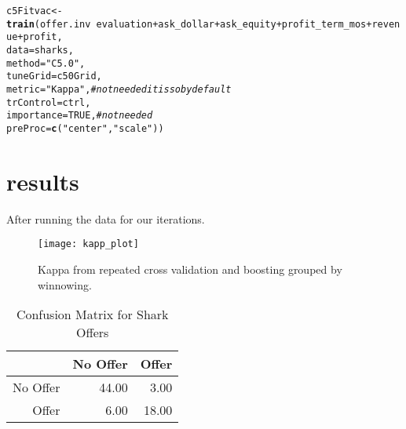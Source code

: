 \documentclass[11pt]{article}\usepackage[]{graphicx}\usepackage[]{color}
\makeatletter
\newcommand{\hlnum}[1]{\textcolor[rgb]{0.686,0.059,0.569}{#1}}%
\newcommand{\hlstr}[1]{\textcolor[rgb]{0.192,0.494,0.8}{#1}}%
\newcommand{\hlcom}[1]{\textcolor[rgb]{0.678,0.584,0.686}{\textit{#1}}}%
\newcommand{\hlopt}[1]{\textcolor[rgb]{0,0,0}{#1}}%
\newcommand{\hlstd}[1]{\textcolor[rgb]{0.345,0.345,0.345}{#1}}%
\newcommand{\hlkwb}[1]{\textcolor[rgb]{0.69,0.353,0.396}{#1}}%
\newcommand{\hlkwc}[1]{\textcolor[rgb]{0.333,0.667,0.333}{#1}}%
\newcommand{\hlkwd}[1]{\textcolor[rgb]{0.737,0.353,0.396}{\textbf{#1}}}%
\newenvironment{kframe}{%
 \def\at@end@of@kframe{}%
 \ifinner\ifhmode%
  \def\at@end@of@kframe{\end{minipage}}%
  \begin{minipage}{\columnwidth}%
 \fi\fi%
 \def\FrameCommand##1{\hskip\@totalleftmargin \hskip-\fboxsep
 \colorbox{shadecolor}{##1}\hskip-\fboxsep
     \hskip-\linewidth \hskip-\@totalleftmargin \hskip\columnwidth}%
 \MakeFramed {\advance\hsize-\width
   \@totalleftmargin\z@ \linewidth\hsize
   \@setminipage}}%
 {\par\unskip\endMakeFramed%
 \at@end@of@kframe}
\newenvironment{knitrout}{}{} %
\providecommand{\SetAlgoLined}{\SetLine}
\makeatother
\begin{document}
\begin{knitrout}
\begin{kframe}
\begin{alltt}
\hlstd{c5Fitvac} \hlkwb{<-} \hlkwd{train}\hlstd{(offer.inv} \hlopt{~}\hlstd{evaluation}\hlopt{+} \hlstd{ask_dollar} \hlopt{+} \hlstd{ask_equity} \hlopt{+} \hlstd{profit_term_mos} \hlopt{+} \hlstd{revenue} \hlopt{+} \hlstd{profit,}
                  \hlkwc{data} \hlstd{= sharks,}
                  \hlkwc{method} \hlstd{=} \hlstr{"C5.0"}\hlstd{,}
                  \hlkwc{tuneGrid} \hlstd{= c50Grid,}
                  \hlkwc{metric} \hlstd{=} \hlstr{"Kappa"}\hlstd{,} \hlcom{# not needed it is so by default}
                  \hlkwc{trControl} \hlstd{= ctrl,}
                  \hlkwc{importance}\hlstd{=}\hlnum{TRUE}\hlstd{,} \hlcom{# not needed}
                  \hlkwc{preProc} \hlstd{=} \hlkwd{c}\hlstd{(}\hlstr{"center"}\hlstd{,} \hlstr{"scale"}\hlstd{))}
\end{alltt}
\end{kframe}
\end{knitrout}

\section{results}

 After running the data for our iterations.

\begin{figure}[h!]
  \caption{Kappa from repeated cross validation and boosting grouped by winnowing.}
  \centering
    \texttt{[image: kapp\_plot]}
\end{figure}




\begin{algorithm}[h!]
   \label{A:tune}
   \SetAlgoLined
   \DontPrintSemicolon
\end{algorithm}

\begin{table}[ht]
\centering
\begin{tabular}{rrr}
  \hline
 & No Offer & Offer \\ 
  \hline
No Offer & 44.00 & 3.00 \\ 
  Offer & 6.00 & 18.00 \\ 
   \hline
\end{tabular}
\caption{Confusion Matrix for Shark Offers} 
\end{table}
\end{document}
